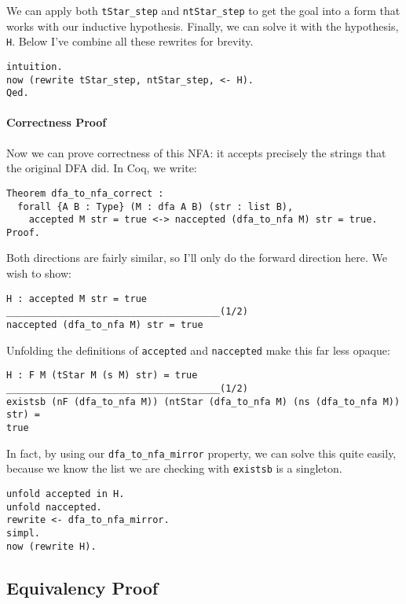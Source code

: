 We can apply both \texttt{tStar_step} and \texttt{ntStar_step} to get the goal into a form that works with our inductive hypothesis.
Finally, we can solve it with the hypothesis, \texttt{H}.
Below I've combine all these rewrites for brevity.

\begin{verbatim}
intuition.
now (rewrite tStar_step, ntStar_step, <- H).
Qed.
\end{verbatim}

\paragraph{Correctness Proof}

Now we can prove correctness of this NFA: it accepts precisely the strings that the original DFA did.
In Coq, we write:

\begin{verbatim}
Theorem dfa_to_nfa_correct :
  forall {A B : Type} (M : dfa A B) (str : list B),
    accepted M str = true <-> naccepted (dfa_to_nfa M) str = true.
Proof.
\end{verbatim}

Both directions are fairly similar, so I'll only do the forward direction here.
We wish to show:

\begin{verbatim}
H : accepted M str = true
______________________________________(1/2)
naccepted (dfa_to_nfa M) str = true
\end{verbatim}

Unfolding the definitions of \texttt{accepted} and \texttt{naccepted} make this far less opaque:

\begin{verbatim}
H : F M (tStar M (s M) str) = true
______________________________________(1/2)
existsb (nF (dfa_to_nfa M)) (ntStar (dfa_to_nfa M) (ns (dfa_to_nfa M)) str) =
true
\end{verbatim}

In fact, by using our \texttt{dfa_to_nfa_mirror} property, we can solve this quite easily, because we know the list we are checking with \texttt{existsb} is a singleton.

\begin{verbatim}
unfold accepted in H.
unfold naccepted.
rewrite <- dfa_to_nfa_mirror.
simpl.
now (rewrite H).
\end{verbatim}

\subsection{Equivalency Proof}

